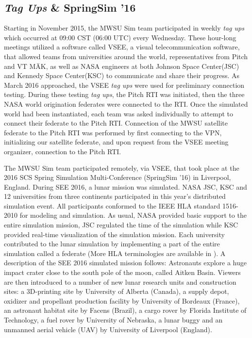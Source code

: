 \documentclass[journal, onecolumn]{IEEEtran}
\begin{document}
\subsection{\textit{Tag Ups} \& SpringSim '16}
Starting in November 2015, the MWSU Sim team participated in weekly \textit{tag ups} which occurred at 09:00 CST (06:00 UTC) every Wednesday.  These hour-long meetings utilized a software called VSEE, a visual telecommunication software, that allowed teams from universities around the world, representatives from Pitch and VT M{\"A}K, as well as NASA engineers at both Johnson Space Center(JSC) and Kennedy Space Center(KSC) to communicate and share their progress.  As March 2016 approached, the VSEE \textit{tag ups} were used for preliminary connection testing. During these testing \textit{tag ups}, the Pitch RTI was initiated, then the three NASA world origination federates were connected to the RTI.  Once the simulated world had been instantiated, each team was asked individually to attempt to connect their federate to the Pitch RTI.  Connection of the MWSU satellite federate to the Pitch RTI was performed by first connecting to the VPN, initializing our satellite federate, and upon request from the VSEE meeting organizer, connection to the Pitch RTI.  

The MWSU Sim team participated remotely, via VSEE, that took place at the 2016 SCS Spring Simulation Multi-Conference (SpringSim '16) in Liverpool, England.  During SEE 2016, a lunar mission was simulated. NASA JSC, KSC and 12 universities from three continents participated in this year\rq{}s distributed simulation event. All participants conformed to the IEEE HLA standard 1516-2010 for modeling and simulation. As usual, NASA provided basic support to the entire simulation mission, JSC regulated the time of the simulation while KSC provided real-time visualization of the simulation mission. Each university contributed to the lunar simulation by implementing a part of the entire simulation called a federate (More HLA terminologies are available in \cite{HLA}). A description of the SEE 2016 simulated mission follows: Astronauts explore a huge impact crater close to the south pole of the moon, called Aitken Basin.  Viewers are then introduced to a number of new lunar research units and construction sites: a 3D-printing site by University of Alberta (Canada), a supply depot, oxidizer and propellant production facility by University of Bordeaux (France), an astronaut habitat site by Facens (Brazil), a cargo rover by Florida Institute of Technology, a fuel rover by University of Nebraska, a lunar buggy and an unmanned aerial vehicle (UAV) by University of Liverpool (England).
\end{document}
